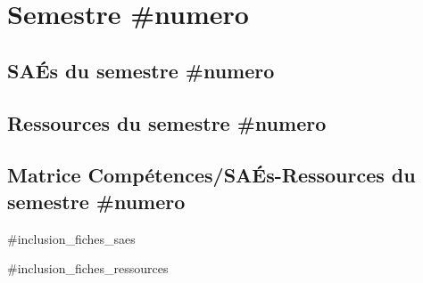


\section{Semestre #numero}

\subsection*{SAÉs du semestre #numero}



\subsection*{Ressources du semestre #numero}


\subsection*{Matrice Compétences/SAÉs-Ressources du semestre #numero}

\scalebox{0.95}{}
%
%
%
%
\newpage

 \label{subsec:FichesSAES#numero}
\addtocounter{subsection}{1}

#inclusion_fiches_saes

 \label{subsec:FichesRessourcesS#numero}
\addtocounter{subsection}{1}

#inclusion_fiches_ressources